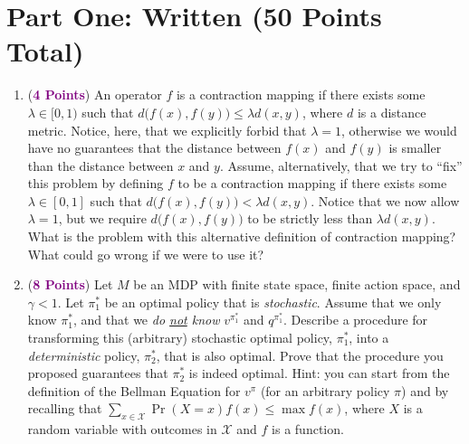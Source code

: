 \documentclass{article}
\newcommand{\POINTS}[1]{\textcolor{purple}{\textbf{{#1}}}}
\begin{document}
\section*{Part One: Written (50 Points Total)}
\begin{enumerate}

    \item (\POINTS{4 Points}) An operator $f$ is a contraction mapping if there exists some $\lambda \in [0,1)$ such that $d\big(f(x), f(y) \big) \leq \lambda d(x, y)$, where $d$ is a distance metric. Notice, here, that we explicitly forbid that $\lambda=1$, otherwise we would have no guarantees that the distance between $f(x)$ and $f(y)$ is smaller than the distance between $x$ and $y$. Assume, alternatively, that we try to ``fix'' this problem by defining $f$ to be a contraction mapping if there exists some $\lambda \in [0,1]$ such that $d\big(f(x), f(y) \big) < \lambda d(x, y)$. Notice that we now allow $\lambda=1$, but we require  $d\big(f(x), f(y) \big)$ to be strictly less than $\lambda d(x, y)$. What is the problem with this alternative definition of contraction mapping? What could go wrong if we were to use it?
    
    
    \vspace{0.8cm}
    \item (\POINTS{8 Points}) Let $M$ be an MDP with finite state space, finite action space, and $\gamma<1$. Let $\pi_1^*$ be an optimal policy that is \textit{stochastic}. Assume that we only know $\pi_1^*$, and that we \textit{do \underline{not} know} $v^{\pi_1^*}$ and $q^{\pi_1^*}$. Describe a procedure for transforming this (arbitrary) stochastic optimal policy, $\pi_1^*$, into a \textit{deterministic} policy, $\pi_2^*$, that is also optimal. Prove that the procedure you proposed guarantees that $\pi_2^*$ is indeed optimal. Hint: you can start from the definition of the Bellman Equation for $v^\pi$ (for an arbitrary policy $\pi$) and by recalling that $\sum_{x \in \mathcal X} \Pr(X=x) f(x) \leq \max f(x)$, where $X$ is a random variable with outcomes in $\mathcal X$ and $f$ is a function.
    

\end{enumerate}
\end{document}
